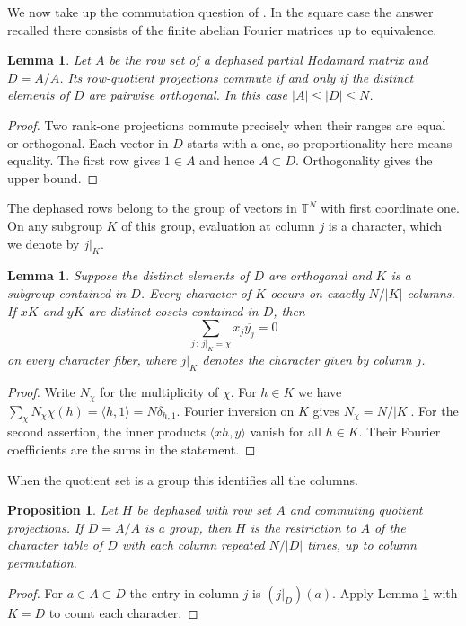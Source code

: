 \documentclass[11pt,a4paper]{article}
\newtheorem{prop}[thm]{Proposition}
\newtheorem{lem}[thm]{Lemma}
\begin{document}
We now take up the commutation question of \cite{bs}. In the square case the answer recalled there consists of the finite abelian Fourier matrices up to equivalence.

\begin{lem}\label{orth}
Let $A$ be the row set of a dephased partial Hadamard matrix and $D=A/A$. Its row-quotient projections commute if and only if the distinct elements of $D$ are pairwise orthogonal. In this case $|A|\leq |D|\leq N$.
\end{lem}
\begin{proof}
Two rank-one projections commute precisely when their ranges are equal or orthogonal. Each vector in $D$ starts with a one, so proportionality here means equality. The first row gives $1\in A$ and hence $A\subset D$. Orthogonality gives the upper bound.
\end{proof}

The dephased rows belong to the group of vectors in $\mathbb T^N$ with first coordinate one. On any subgroup $K$ of this group, evaluation at column $j$ is a character, which we denote by $j|_K$.

\begin{lem}\label{fibres}
Suppose the distinct elements of $D$ are orthogonal and $K$ is a subgroup contained in $D$. Every character of $K$ occurs on exactly $N/|K|$ columns. If $xK$ and $yK$ are distinct cosets contained in $D$, then
\[
 \sum_{j\, :\, j|_K=\chi} x_j\overline{y_j}=0
\]
on every character fiber, where $j|_K$ denotes the character given by column $j$.
\end{lem}
\begin{proof}
Write $N_\chi$ for the multiplicity of $\chi$. For $h\in K$ we have $\sum_\chi N_\chi\chi(h)=\langle h,1\rangle=N\delta_{h,1}$. Fourier inversion on $K$ gives $N_\chi=N/|K|$. For the second assertion, the inner products $\langle xh,y\rangle$ vanish for all $h\in K$. Their Fourier coefficients are the sums in the statement.
\end{proof}

When the quotient set is a group this identifies all the columns.

\begin{prop}\label{repeatfourier}
Let $H$ be dephased with row set $A$ and commuting quotient projections. If $D=A/A$ is a group, then $H$ is the restriction to $A$ of the character table of $D$ with each column repeated $N/|D|$ times, up to column permutation.
\end{prop}
\begin{proof}
For $a\in A\subset D$ the entry in column $j$ is $(j|_D)(a)$. Apply Lemma \ref{fibres} with $K=D$ to count each character.
\end{proof}
\end{document}
